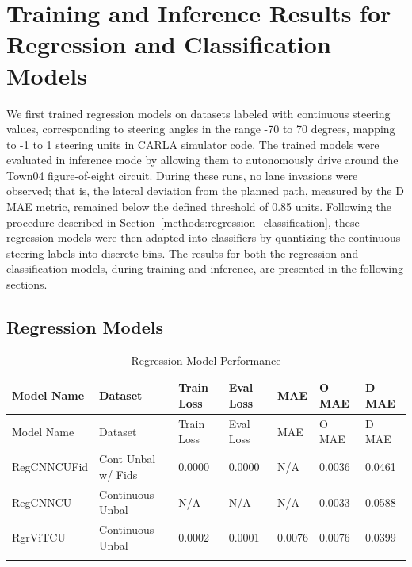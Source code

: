 


\section{Training and Inference Results for Regression and Classification Models}

We first trained regression models on datasets labeled with continuous steering values, corresponding to steering angles in the range -70 to 70 degrees, mapping to -1 to 1 steering units in CARLA simulator code. The trained models were evaluated in inference mode by allowing them to autonomously drive around the Town04 figure-of-eight circuit. During these runs, no lane invasions were observed; that is, the lateral deviation from the planned path, measured by the D MAE metric, remained below the defined threshold of 0.85 units. Following the procedure described in Section~\ref{methods:regression_classification}, these regression models were then adapted into classifiers by quantizing the continuous steering labels into discrete bins. The results for both the regression and classification models, during training and inference, are presented in the following sections.


\subsection{Regression Models}
\begin{longtable}{@{}lllllll@{}}
\toprule
Model Name & Dataset & Train Loss & Eval Loss & MAE & O MAE & D MAE \\
\midrule
\endfirsthead
\toprule
Model Name & Dataset & Train Loss & Eval Loss & MAE & O MAE & D MAE \\
\midrule
\endhead
RegCNNCUFid & Cont Unbal w/ Fids & 0.0000 & 0.0000 & N/A & 0.0036 & 0.0461 \\
RegCNNCU & Continuous Unbal & N/A & N/A & N/A & 0.0033 & 0.0588 \\
RgrViTCU & Continuous Unbal & 0.0002 & 0.0001 & 0.0076 & 0.0076 & 0.0399 \\
\bottomrule
\caption{Regression Model Performance}
\label{results:table_regression_models}
\end{longtable}

